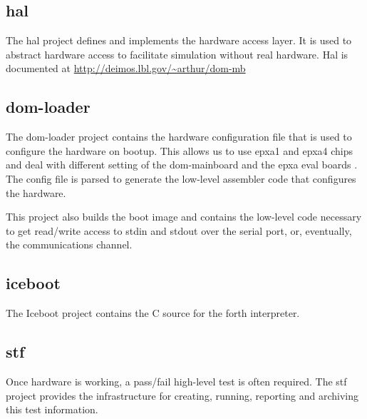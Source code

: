 \documentclass{article}
\begin{document}
        \subsection{hal}

 The hal project defines and implements the hardware access layer.  
It is used to 
abstract hardware access to facilitate simulation
without real hardware.  Hal is documented at \url{http://deimos.lbl.gov/~arthur/dom-mb}

        \subsection{dom-loader}

 The dom-loader project contains the hardware configuration file that 
is used to configure the hardware on bootup.  This allows us to 
                         use epxa1 and epxa4 chips and
                          deal with different setting of the
                          dom-mainboard and the epxa eval boards
                        \label{configfile}.  The config file is
parsed to generate the low-level assembler code that configures
the hardware.

This project also builds the boot image and contains the
low-level code necessary to get read/write access to stdin
and stdout over the serial port, or, eventually, the communications
channel.
                        
        \subsection{iceboot}

The Iceboot project contains the C source for
the forth interpreter.

        \subsection{stf}

 Once hardware is working, a pass/fail high-level test
is often required.  The stf project provides the infrastructure
for creating, running, reporting and archiving this test
information.

\printindex
\end{document}
